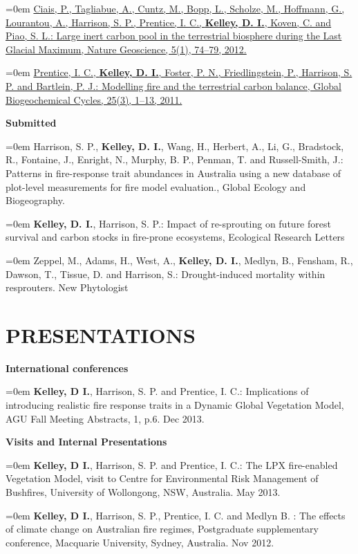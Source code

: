 \documentclass[paper=a4,fontsize=11pt]{scrartcl}	 			%
\newcommand{\sepspace}{\vspace*{0em}}			%
\newcommand{\NewPart}[1]{\vspace*{-0.5em} \section*{\uppercase{#1}} \vspace*{-0.75em} }
\newcommand{\BibEntry}[2]{
		\vspace*{-1em} \noindent \textbf{#1} \hfill \par					%
		\hangindent=0em\hangafter=0 \small #2} 	%
\begin{document}
\BibEntry{} {\href{http://www.nature.com/ngeo/journal/v5/n1/full/ngeo1324.html}{Ciais, P., Tagliabue, A., Cuntz, M., Bopp, L., Scholze, M., Hoffmann, G., Lourantou, A., Harrison, S. P., Prentice, I. C., \textbf{Kelley, D. I.}, Koven, C. and Piao, S. L.: Large inert carbon pool in the terrestrial biosphere during the Last Glacial Maximum, Nature Geoscience, 5(1), 74--79, 2012.}}


\BibEntry{} {\href{http://onlinelibrary.wiley.com/doi/10.1029/2010GB003906/abstract}{Prentice, I. C., \textbf{Kelley, D. I.}, Foster, P. N., Friedlingstein, P., Harrison, S. P. and Bartlein, P. J.: Modelling fire and the terrestrial carbon balance, Global Biogeochemical Cycles, 25(3), 1--13, 2011.}}
\sepspace

\BibEntry{\newline \newline Submitted} {Harrison, S. P., \textbf{Kelley, D. I.}, Wang, H., Herbert, A., Li, G., Bradstock, R., Fontaine, J., Enright, N., Murphy, B. P., Penman, T. and Russell-Smith, J.: Patterns in fire-response trait abundances in Australia using a new database of plot-level measurements for fire model evaluation., Global Ecology and Biogeography.}

\BibEntry{} {\textbf{Kelley, D. I.}, Harrison, S. P.: Impact of re-sprouting on future forest survival and carbon stocks in fire-prone ecosystems, Ecological Research Letters}

\BibEntry{} {Zeppel, M., Adams, H., West, A., \textbf{Kelley, D. I.}, Medlyn, B., Fensham, R., Dawson, T., Tissue, D. and Harrison, S.: Drought-induced mortality within resprouters. New Phytologist }


\NewPart{Presentations}
\BibEntry{\newline International conferences} {\textbf{Kelley, D I.}, Harrison, S. P. and Prentice, I. C.: Implications of introducing realistic fire response traits in a Dynamic Global Vegetation Model, AGU Fall Meeting Abstracts, 1,  p.6. Dec 2013.}
\sepspace

\BibEntry{\newline \newline  Visits and Internal Presentations} {\textbf{Kelley, D I.}, Harrison, S. P. and Prentice, I. C.: The LPX fire-enabled Vegetation Model, visit to Centre for Environmental Risk Management of Bushfires, University of Wollongong, NSW, Australia. May 2013.}

\BibEntry{} {\textbf{Kelley, D I.}, Harrison, S. P., Prentice, I. C. and Medlyn B. : The effects of climate change on Australian fire regimes, Postgraduate supplementary conference, Macquarie University, Sydney, Australia. Nov 2012.}
\end{document}
